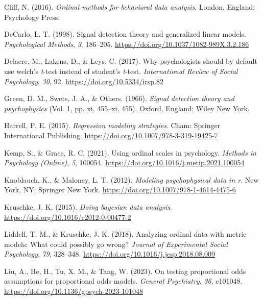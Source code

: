 \documentclass[
  man,floatsintext]{apa6}
\newlength{\cslhangindent}
\newenvironment{CSLReferences}[2] %
 {\begin{list}{}{%
  \setlength{\itemindent}{0pt}
  \setlength{\leftmargin}{0pt}
  \setlength{\parsep}{0pt}
  \ifodd #1
   \setlength{\leftmargin}{\cslhangindent}
   \setlength{\itemindent}{-1\cslhangindent}
  \fi
  \setlength{\itemsep}{#2\baselineskip}}}
 {\end{list}}
\begin{document}
\label{refs}
\begin{CSLReferences}{1}{0}
Cliff, N. (2016). \emph{Ordinal methods for behavioral data analysis}. London, England: Psychology Press.

DeCarlo, L. T. (1998). Signal detection theory and generalized linear models. \emph{Psychological Methods}, \emph{3}, 186--205. \url{https://doi.org/10.1037/1082-989X.3.2.186}

Delacre, M., Lakens, D., \& Leys, C. (2017). Why psychologists should by default use welch's \emph{t}-test instead of student's \emph{t}-test. \emph{International Review of Social Psychology}, \emph{30}, 92. \url{https://doi.org/10.5334/irsp.82}

Green, D. M., Swets, J. A., \& Others. (1966). \emph{Signal detection theory and psychophysics} (Vol. 1, pp. xi, 455--xi, 455). Oxford, England: Wiley New York.

Harrell, F. E. (2015). \emph{Regression modeling strategies}. Cham: Springer International Publishing. \url{https://doi.org/10.1007/978-3-319-19425-7}

Kemp, S., \& Grace, R. C. (2021). Using ordinal scales in psychology. \emph{Methods in Psychology (Online)}, \emph{5}, 100054. \url{https://doi.org/10.1016/j.metip.2021.100054}

Knoblauch, K., \& Maloney, L. T. (2012). \emph{Modeling psychophysical data in r}. New York, NY: Springer New York. \url{https://doi.org/10.1007/978-1-4614-4475-6}

Kruschke, J. K. (2015). \emph{Doing bayesian data analysis}. \url{https://doi.org/10.1016/c2012-0-00477-2}

Liddell, T. M., \& Kruschke, J. K. (2018). Analyzing ordinal data with metric models: What could possibly go wrong? \emph{Journal of Experimental Social Psychology}, \emph{79}, 328--348. \url{https://doi.org/10.1016/j.jesp.2018.08.009}

Liu, A., He, H., Tu, X. M., \& Tang, W. (2023). On testing proportional odds assumptions for proportional odds models. \emph{General Psychiatry}, \emph{36}, e101048. \url{https://doi.org/10.1136/gpsych-2023-101048}


\end{CSLReferences}
\end{document}
